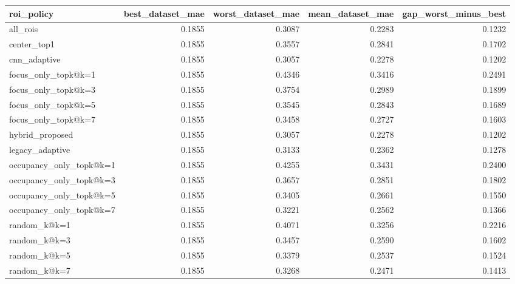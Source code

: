 \begin{tabular}{lrrrr}
\toprule
roi_policy & best_dataset_mae & worst_dataset_mae & mean_dataset_mae & gap_worst_minus_best \\
\midrule
all_rois & 0.1855 & 0.3087 & 0.2283 & 0.1232 \\
center_top1 & 0.1855 & 0.3557 & 0.2841 & 0.1702 \\
cnn_adaptive & 0.1855 & 0.3057 & 0.2278 & 0.1202 \\
focus_only_topk@k=1 & 0.1855 & 0.4346 & 0.3416 & 0.2491 \\
focus_only_topk@k=3 & 0.1855 & 0.3754 & 0.2989 & 0.1899 \\
focus_only_topk@k=5 & 0.1855 & 0.3545 & 0.2843 & 0.1689 \\
focus_only_topk@k=7 & 0.1855 & 0.3458 & 0.2727 & 0.1603 \\
hybrid_proposed & 0.1855 & 0.3057 & 0.2278 & 0.1202 \\
legacy_adaptive & 0.1855 & 0.3133 & 0.2362 & 0.1278 \\
occupancy_only_topk@k=1 & 0.1855 & 0.4255 & 0.3431 & 0.2400 \\
occupancy_only_topk@k=3 & 0.1855 & 0.3657 & 0.2851 & 0.1802 \\
occupancy_only_topk@k=5 & 0.1855 & 0.3405 & 0.2661 & 0.1550 \\
occupancy_only_topk@k=7 & 0.1855 & 0.3221 & 0.2562 & 0.1366 \\
random_k@k=1 & 0.1855 & 0.4071 & 0.3256 & 0.2216 \\
random_k@k=3 & 0.1855 & 0.3457 & 0.2590 & 0.1602 \\
random_k@k=5 & 0.1855 & 0.3379 & 0.2537 & 0.1524 \\
random_k@k=7 & 0.1855 & 0.3268 & 0.2471 & 0.1413 \\
\bottomrule
\end{tabular}
